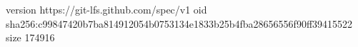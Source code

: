 version https://git-lfs.github.com/spec/v1
oid sha256:c99847420b7ba814912054b0753134e1833b25b4fba28656556f90ff39415522
size 174916
